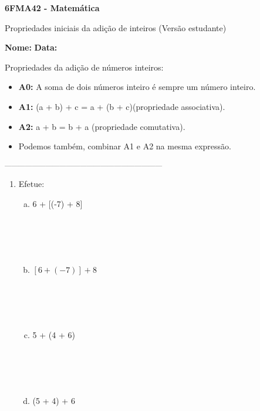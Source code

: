 \documentclass[a4paper,14pt]{article}
\begin{document}
	
	\noindent\textbf{6FMA42 - Matemática} 
	
	\begin{center}Propriedades iniciais da adição de inteiros (Versão estudante)
	\end{center}
	
	\noindent\textbf{Nome:} \underline{\hspace{10cm}}
	\noindent\textbf{Data:} \underline{\hspace{4cm}}
	
	\begin{multicols}{2}
		\noindent Propriedades da adição de números inteiros:
		\begin{itemize}
			\item \textbf{A0:} A soma de dois números inteiro é sempre um número inteiro.
			\item \textbf{A1:} (a + b) + c = a + (b + c)(propriedade associativa).
			\item \textbf{A2:} a + b = b + a (propriedade comutativa).
			\item Podemos também, combinar A1 e A2 na mesma expressão. 
		\end{itemize}
	\textsubscript{---------------------------------------------------------------------}
    	\begin{enumerate}
    		\item Efetue:
    		\begin{enumerate}[a)]
    			\item 6 + [(-7) + 8] \\\\\\\\\\
    			\item $[6 + (-7)] + 8$ \\\\\\\\\\
    			\item 5 + (4 + 6) \\\\\\\\\\
    			\item (5 + 4) + 6 \\\\\\\\\\

\end{enumerate}
\end{enumerate}
\end{multicols}
\end{document}
